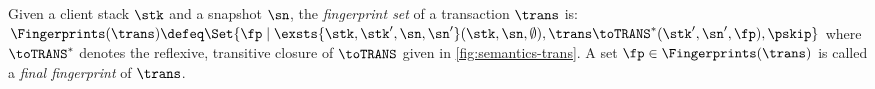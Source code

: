 

\begin{definition}
Given a client stack $\stk$ and a snapshot $\sn$, the \emph{fingerprint set} of a transaction $\trans$ is:
\(
\Fingerprints(\trans) \defeq \Set{\fp \mid \exsts{\stk,\stk',\sn,\sn'} (\stk, \sn, \emptyset), \trans \toTRANS^* (\stk', \sn', \fp), \pskip }
\)
where $\toTRANS^*$ denotes the reflexive, transitive closure of $\toTRANS$ given in \cref{fig:semantics-trans}.  
A set $\fp \in \Fingerprints(\trans)$ is called a \emph{final fingerprint} of $\trans$. 
\end{definition}
\noindent 


